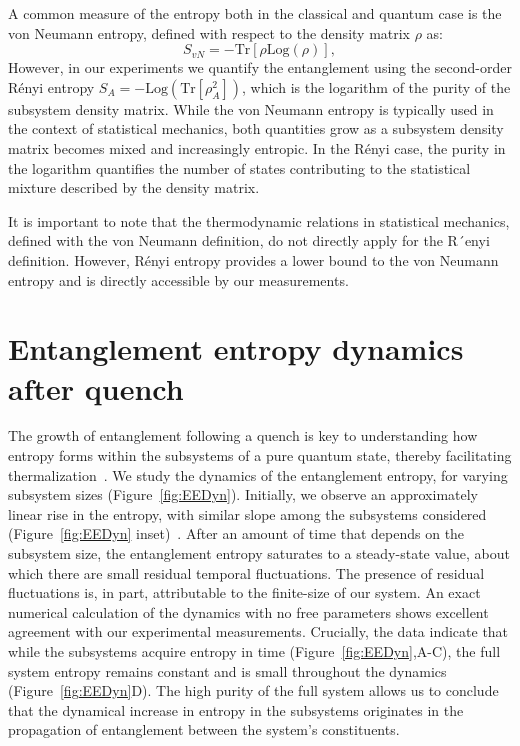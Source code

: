 A common measure of the entropy both in the classical and quantum case is the von Neumann entropy, defined with respect to the density matrix $\rho$ as:
\begin{equation}
S_{vN} = - \textrm{Tr}[\rho \textrm{Log}(\rho)],
\end{equation}
However, in our experiments we quantify the entanglement using the second-order R\'{e}nyi entropy $S_A = -\textrm{Log}(\textrm{Tr}[\rho_A^2])$, which is the logarithm of the purity of the subsystem density matrix. While the von Neumann entropy is typically used in the context of statistical mechanics, both quantities grow as a subsystem density matrix becomes mixed and increasingly entropic. In the R\'{e}nyi case, the purity in the logarithm quantifies the number of states contributing to the statistical mixture described by the density matrix. 

It is important to note that the thermodynamic relations in statistical mechanics, defined with the
von Neumann definition, do not directly apply for the R´enyi definition. However, R\'{e}nyi entropy provides a lower bound to the von Neumann entropy and is directly accessible by our measurements.

\section{Entanglement entropy dynamics after quench}
The growth of entanglement following a quench is key to understanding how entropy forms within the subsystems of a pure quantum state, thereby facilitating thermalization~\cite{Calabrese2005, Daley2012, Schachenmayer2013, Hazzard2014}. We study the dynamics of the entanglement entropy, for varying subsystem sizes (Figure~\ref{fig:EEDyn}). Initially, we observe an approximately linear rise in the entropy, with similar slope among the subsystems considered (Figure~\ref{fig:EEDyn} inset)~\cite{Calabrese2005}. After an amount of time that depends on the subsystem size, the entanglement entropy saturates to a steady-state value, about which there are small residual temporal fluctuations. The presence of residual fluctuations is, in part, attributable to the finite-size of our system. An exact numerical calculation of the dynamics with no free parameters shows excellent agreement with our experimental measurements. Crucially, the data indicate that while the subsystems acquire entropy in time (Figure~\ref{fig:EEDyn},A-C), the full system entropy remains constant and is small throughout the dynamics (Figure~\ref{fig:EEDyn}D). The high purity of the full system allows us to conclude that the dynamical increase in entropy in the subsystems originates in the propagation of entanglement between the system's constituents. 

